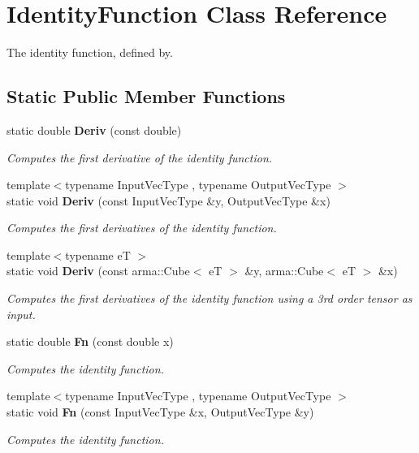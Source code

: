 \section{Identity\+Function Class Reference}
\label{classmlpack_1_1ann_1_1IdentityFunction}


The identity function, defined by.  


\subsection*{Static Public Member Functions}
\begin{DoxyCompactItemize}
\item 
static double \textbf{ Deriv} (const double)
\begin{DoxyCompactList}\small\item\em Computes the first derivative of the identity function. \end{DoxyCompactList}\item 
{\footnotesize template$<$typename Input\+Vec\+Type , typename Output\+Vec\+Type $>$ }\\static void \textbf{ Deriv} (const Input\+Vec\+Type \&y, Output\+Vec\+Type \&x)
\begin{DoxyCompactList}\small\item\em Computes the first derivatives of the identity function. \end{DoxyCompactList}\item 
{\footnotesize template$<$typename eT $>$ }\\static void \textbf{ Deriv} (const arma\+::\+Cube$<$ eT $>$ \&y, arma\+::\+Cube$<$ eT $>$ \&x)
\begin{DoxyCompactList}\small\item\em Computes the first derivatives of the identity function using a 3rd order tensor as input. \end{DoxyCompactList}\item 
static double \textbf{ Fn} (const double x)
\begin{DoxyCompactList}\small\item\em Computes the identity function. \end{DoxyCompactList}\item 
{\footnotesize template$<$typename Input\+Vec\+Type , typename Output\+Vec\+Type $>$ }\\static void \textbf{ Fn} (const Input\+Vec\+Type \&x, Output\+Vec\+Type \&y)
\begin{DoxyCompactList}\small\item\em Computes the identity function. \end{DoxyCompactList}\end{DoxyCompactItemize}


